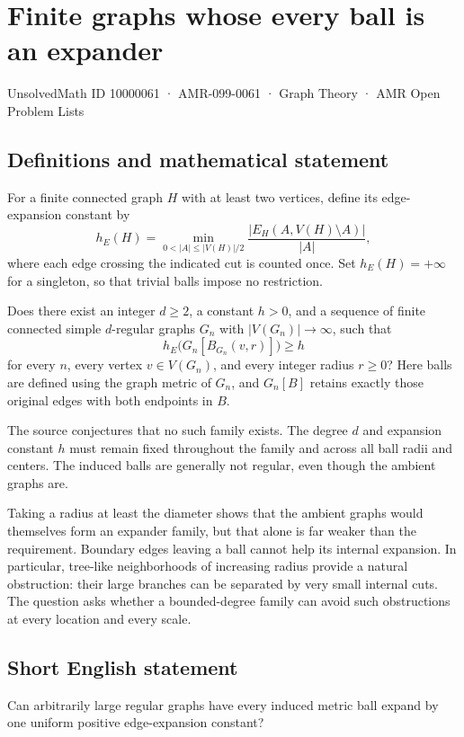 \documentclass[11pt,a4paper]{article}
\begin{document}
\section*{Finite graphs whose every ball is an expander}\label{10000061}
{\small UnsolvedMath ID 10000061 · AMR-099-0061 · Graph Theory · AMR Open Problem Lists}
\subsection{Definitions and mathematical statement}
For a finite connected graph $H$ with at least two vertices, define its edge-expansion constant by
\[
h_E(H)=\min_{0<|A|\le|V(H)|/2}
\frac{|E_H(A,V(H)\setminus A)|}{|A|},
\]
where each edge crossing the indicated cut is counted once. Set $h_E(H)=+\infty$ for a singleton, so that trivial balls impose no restriction.

Does there exist an integer $d\ge2$, a constant $h>0$, and a sequence of finite connected simple $d$-regular graphs $G_n$ with $|V(G_n)|\to\infty$, such that
\[
h_E\bigl(G_n[B_{G_n}(v,r)]\bigr)\ge h
\]
for every $n$, every vertex $v\in V(G_n)$, and every integer radius $r\ge0$? Here balls are defined using the graph metric of $G_n$, and $G_n[B]$ retains exactly those original edges with both endpoints in $B$.

The source conjectures that no such family exists. The degree $d$ and expansion constant $h$ must remain fixed throughout the family and across all ball radii and centers. The induced balls are generally not regular, even though the ambient graphs are.

Taking a radius at least the diameter shows that the ambient graphs would themselves form an expander family, but that alone is far weaker than the requirement. Boundary edges leaving a ball cannot help its internal expansion. In particular, tree-like neighborhoods of increasing radius provide a natural obstruction: their large branches can be separated by very small internal cuts. The question asks whether a bounded-degree family can avoid such obstructions at every location and every scale.
\subsection{Short English statement}
Can arbitrarily large regular graphs have every induced metric ball expand by one uniform positive edge-expansion constant?
\end{document}
